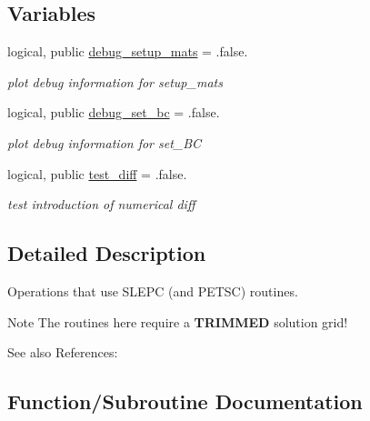 \subsection*{Variables}
\begin{DoxyCompactItemize}
\item 
logical, public \hyperlink{namespaceslepc__ops_aff5aa0d485bc34e2f6e320172fcc4ccb}{debug\+\_\+setup\+\_\+mats} = .false.
\begin{DoxyCompactList}\small\item\em plot debug information for setup\+\_\+mats \end{DoxyCompactList}\item 
logical, public \hyperlink{namespaceslepc__ops_ad57b5fd70608c1b97454963bdd1c4f5b}{debug\+\_\+set\+\_\+bc} = .false.
\begin{DoxyCompactList}\small\item\em plot debug information for set\+\_\+\+BC \end{DoxyCompactList}\item 
logical, public \hyperlink{namespaceslepc__ops_a57d0ef4131e939894b34bb07e30e631b}{test\+\_\+diff} = .false.
\begin{DoxyCompactList}\small\item\em test introduction of numerical diff \end{DoxyCompactList}\end{DoxyCompactItemize}


\subsection{Detailed Description}
Operations that use S\+L\+E\+PC (and P\+E\+T\+SC) routines. 

\begin{DoxyNote}{Note}
The routines here require a {\bfseries T\+R\+I\+M\+M\+ED} solution grid! 
\end{DoxyNote}
\begin{DoxySeeAlso}{See also}
References\+: \cite{Hernandez2005slepc} 
\end{DoxySeeAlso}


\subsection{Function/\+Subroutine Documentation}
\mbox{\label{namespaceslepc__ops_aabe2aef90f039316bf3f03e651a6e7e0}} 
